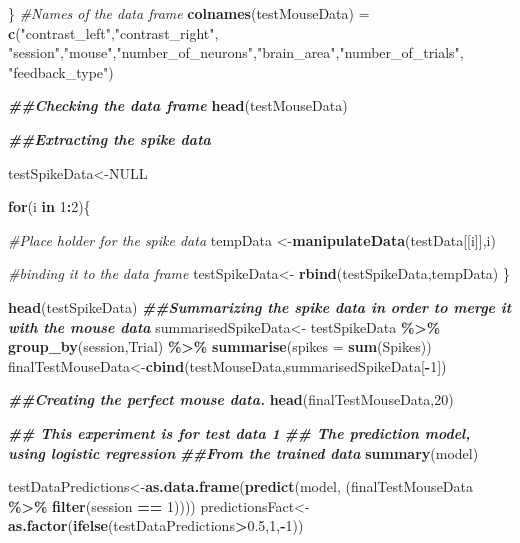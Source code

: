 \documentclass[
]{article}
\newenvironment{Shaded}{\begin{snugshade}}{\end{snugshade}}
\newcommand{\AttributeTok}[1]{\textcolor[rgb]{0.13,0.29,0.53}{#1}}
\newcommand{\CommentTok}[1]{\textcolor[rgb]{0.56,0.35,0.01}{\textit{#1}}}
\newcommand{\ConstantTok}[1]{\textcolor[rgb]{0.56,0.35,0.01}{#1}}
\newcommand{\ControlFlowTok}[1]{\textcolor[rgb]{0.13,0.29,0.53}{\textbf{#1}}}
\newcommand{\DecValTok}[1]{\textcolor[rgb]{0.00,0.00,0.81}{#1}}
\newcommand{\DocumentationTok}[1]{\textcolor[rgb]{0.56,0.35,0.01}{\textbf{\textit{#1}}}}
\newcommand{\FloatTok}[1]{\textcolor[rgb]{0.00,0.00,0.81}{#1}}
\newcommand{\FunctionTok}[1]{\textcolor[rgb]{0.13,0.29,0.53}{\textbf{#1}}}
\newcommand{\NormalTok}[1]{#1}
\newcommand{\OtherTok}[1]{\textcolor[rgb]{0.56,0.35,0.01}{#1}}
\newcommand{\SpecialCharTok}[1]{\textcolor[rgb]{0.81,0.36,0.00}{\textbf{#1}}}
\newcommand{\StringTok}[1]{\textcolor[rgb]{0.31,0.60,0.02}{#1}}
\begin{document}
\begin{Shaded}
\begin{Highlighting}[]
\NormalTok{\}}
\CommentTok{\#Names of the data frame}
\FunctionTok{colnames}\NormalTok{(testMouseData) }\OtherTok{=} \FunctionTok{c}\NormalTok{(}\StringTok{"contrast\_left"}\NormalTok{,}\StringTok{"contrast\_right"}\NormalTok{, }\StringTok{"session"}\NormalTok{,}\StringTok{"mouse"}\NormalTok{,}\StringTok{"number\_of\_neurons"}\NormalTok{,}\StringTok{"brain\_area"}\NormalTok{,}\StringTok{"number\_of\_trials"}\NormalTok{, }\StringTok{"feedback\_type"}\NormalTok{)}


\DocumentationTok{\#\#Checking the data frame}
\FunctionTok{head}\NormalTok{(testMouseData)}

\DocumentationTok{\#\#Extracting the spike data}

\NormalTok{testSpikeData}\OtherTok{\textless{}{-}}\ConstantTok{NULL}

\ControlFlowTok{for}\NormalTok{(i }\ControlFlowTok{in} \DecValTok{1}\SpecialCharTok{:}\DecValTok{2}\NormalTok{)\{}
  
  \CommentTok{\#Place holder for the spike data}
\NormalTok{  tempData }\OtherTok{\textless{}{-}}\FunctionTok{manipulateData}\NormalTok{(testData[[i]],i)}
  
  
  \CommentTok{\#binding it to the data frame}
\NormalTok{  testSpikeData}\OtherTok{\textless{}{-}} \FunctionTok{rbind}\NormalTok{(testSpikeData,tempData)}
\NormalTok{\}}

\FunctionTok{head}\NormalTok{(testSpikeData)}
\DocumentationTok{\#\#Summarizing the spike data in order to merge it with the mouse data}
\NormalTok{summarisedSpikeData}\OtherTok{\textless{}{-}}\NormalTok{ testSpikeData }\SpecialCharTok{\%\textgreater{}\%}  \FunctionTok{group\_by}\NormalTok{(session,Trial) }\SpecialCharTok{\%\textgreater{}\%} \FunctionTok{summarise}\NormalTok{(}\AttributeTok{spikes =} \FunctionTok{sum}\NormalTok{(Spikes))}
\NormalTok{finalTestMouseData}\OtherTok{\textless{}{-}}\FunctionTok{cbind}\NormalTok{(testMouseData,summarisedSpikeData[}\SpecialCharTok{{-}}\DecValTok{1}\NormalTok{])}

\DocumentationTok{\#\#Creating the perfect mouse data.}
\FunctionTok{head}\NormalTok{(finalTestMouseData,}\DecValTok{20}\NormalTok{)}




\DocumentationTok{\#\# This experiment is for test data 1}
\DocumentationTok{\#\# The prediction model, using logistic regression }
\DocumentationTok{\#\#From the trained data}
\FunctionTok{summary}\NormalTok{(model)}



\NormalTok{testDataPredictions}\OtherTok{\textless{}{-}}\FunctionTok{as.data.frame}\NormalTok{(}\FunctionTok{predict}\NormalTok{(model, (finalTestMouseData }\SpecialCharTok{\%\textgreater{}\%} \FunctionTok{filter}\NormalTok{(session }\SpecialCharTok{==} \DecValTok{1}\NormalTok{))))}
\NormalTok{predictionsFact}\OtherTok{\textless{}{-}} \FunctionTok{as.factor}\NormalTok{(}\FunctionTok{ifelse}\NormalTok{(testDataPredictions}\SpecialCharTok{\textgreater{}}\FloatTok{0.5}\NormalTok{,}\DecValTok{1}\NormalTok{,}\SpecialCharTok{{-}}\DecValTok{1}\NormalTok{))}



\end{Highlighting}
\end{Shaded}
\end{document}
